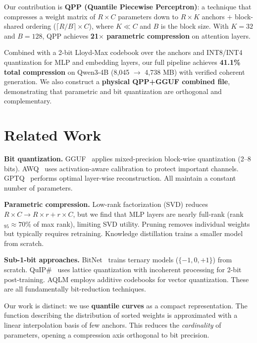 \documentclass[11pt,a4paper]{article}
\begin{document}
Our contribution is \textbf{QPP (Quantile Piecewise Perceptron)}: a technique that compresses a weight matrix of $R \times C$ parameters down to $R \times K$ anchors $+$ block-shared ordering ($\lceil R/B \rceil \times C$), where $K \ll C$ and $B$ is the block size. With $K = 32$ and $B = 128$, QPP achieves \textbf{21$\times$ parametric compression} on attention layers.

Combined with a 2-bit Lloyd-Max codebook over the anchors and INT8/INT4 quantization for MLP and embedding layers, our full pipeline achieves \textbf{41.1\% total compression} on Qwen3-4B (8,045 $\rightarrow$ 4,738 MB) with verified coherent generation. We also construct a \textbf{physical QPP+GGUF combined file}, demonstrating that parametric and bit quantization are orthogonal and complementary.


\section{Related Work}

\textbf{Bit quantization.} GGUF~\cite{gguf} applies mixed-precision block-wise quantization (2--8 bits). AWQ~\cite{awq} uses activation-aware calibration to protect important channels. GPTQ~\cite{gptq} performs optimal layer-wise reconstruction. All maintain a constant number of parameters.

\textbf{Parametric compression.} Low-rank factorization (SVD) reduces $R \times C \rightarrow R \times r + r \times C$, but we find that MLP layers are nearly full-rank (rank$_{95} \approx 70\%$ of max rank), limiting SVD utility. Pruning removes individual weights but typically requires retraining. Knowledge distillation trains a smaller model from scratch.

\textbf{Sub-1-bit approaches.} BitNet~\cite{bitnet} trains ternary models ($\{-1,0,+1\}$) from scratch. QuIP\#~\cite{quip} uses lattice quantization with incoherent processing for 2-bit post-training. AQLM employs additive codebooks for vector quantization. These are all fundamentally bit-reduction techniques.

Our work is distinct: we use \textbf{quantile curves} as a compact representation. The function describing the distribution of sorted weights is approximated with a linear interpolation basis of few anchors. This reduces the \textit{cardinality} of parameters, opening a compression axis orthogonal to bit precision.
\end{document}

